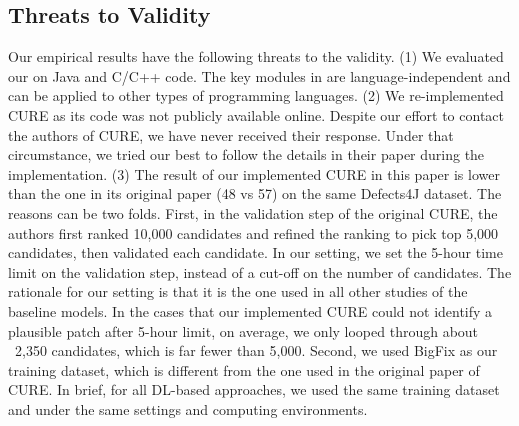 \subsection{Threats to Validity}



Our empirical results have the following threats to the validity. (1)
We evaluated our {\tool} on Java and C/C++ code.  The key modules in
{\tool} are language-independent and can be applied to other types of
programming languages.  (2) We re-implemented CURE as its code was not
publicly available online. Despite our effort to contact the authors
of CURE, we have never received their response. Under that
circumstance, we tried our best to follow the details in their paper
during the implementation. (3) The result of our implemented CURE in
this paper is lower than the one in its original paper (48 vs 57) on
the same Defects4J dataset. The reasons can be two folds. First, in
the validation step of the original CURE, the authors first ranked
10,000 candidates and refined the ranking to pick top 5,000
candidates, then validated each candidate. In our setting, we set the
5-hour time limit on the validation step, instead of a cut-off on the
number of candidates. The rationale for our setting is that it is the
one used in all other studies of the baseline models. In the cases
that our implemented CURE could not identify a plausible patch after
5-hour limit, on average, we only looped through about ~2,350
candidates, which is far fewer than 5,000. Second, we used BigFix as
our training dataset, which is different from the one used in the
original paper of CURE. In brief, for all DL-based approaches, we
used the same training dataset and under the same settings and
computing environments.





